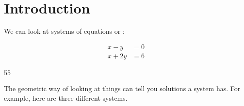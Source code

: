 \section{Introduction}

We can look at systems of equations 
 or :

\noindent
\begin{minipage}{0.45\textwidth}
    \begin{center}
        \large
        \begin{align*}
            x - y &= 0 \\
            x + 2y &= 6 
        \end{align*}
    \end{center}
\end{minipage}
%
\hfil 
%
\begin{minipage}{0.45\textwidth}
    \begin{center}
        \begin{myTikzpictureGrid}{0.25} {5}{5}
            \end{myTikzpictureGrid}
    \end{center}
\end{minipage}

\noindent 
The geometric way of looking at things can tell you   solutions 
a system has. 
For example, here are three different systems.

\vfil

